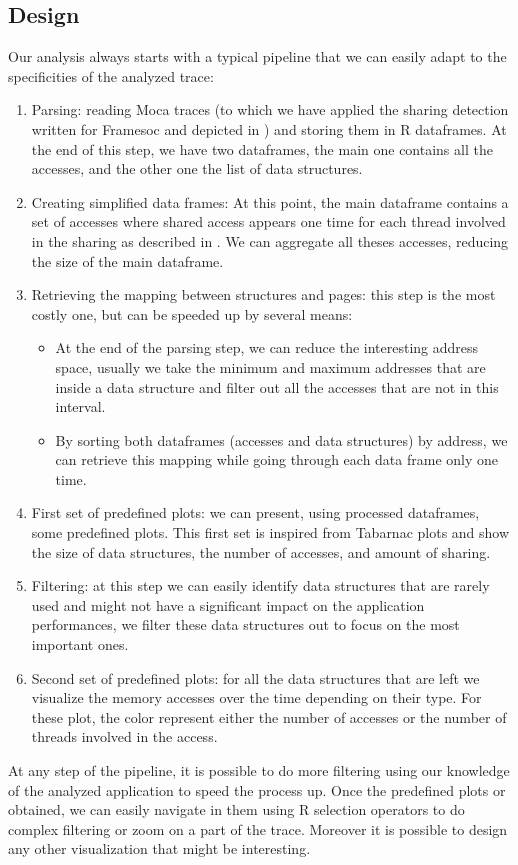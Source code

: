 \subsection{Design}

Our analysis always starts with a typical pipeline that we can easily adapt to the specificities of the analyzed trace:
\begin{enumerate}
    \item Parsing: reading \gls{Moca} traces (to which we have applied the sharing detection written for \gls{Framesoc} and depicted in )
        and storing them in \gls{R} dataframes.
        At the end of this step, we have two dataframes, the main one contains all the accesses, and the other one the list of data structures.
    \item Creating simplified data frames: At this point, the main dataframe contains a set of accesses where shared access appears one time for each thread involved in the sharing as described in .
        We can aggregate all theses accesses, reducing the size of the main dataframe.
    \item Retrieving the mapping between structures and pages: this step is the most costly one, but can be speeded up by several means:
        \begin{itemize}
            \item At the end of the parsing step, we can reduce the interesting address space, usually we take the minimum and maximum addresses that are inside a data structure and filter out all the accesses that are not in this interval.
            \item By sorting both dataframes (accesses and data structures) by address, we can retrieve this mapping while going through each data frame only one time.
        \end{itemize}
    \item First set of predefined plots: we can present, using processed dataframes, some predefined  plots. This first set is inspired from \gls{Tabarnac} plots and show the size of data structures, the number of accesses, and amount of sharing.
    \item  Filtering: at this step we can easily identify data structures that are rarely used and might not have a significant impact on the application performances, we filter these data structures out to focus on the most important ones.
    \item Second set of predefined plots: for all the data structures that are left we visualize the memory accesses over the time depending on their type.
        For these plot, the color represent either the number of accesses or the number of threads involved in the access.
\end{enumerate}
At any step of the pipeline, it is possible to do more filtering using our knowledge of the analyzed application to speed the process up.
Once the predefined plots or obtained, we can easily navigate in them using \gls{R} selection operators to do complex filtering or zoom on a part of the trace.
Moreover it is possible to design any other visualization that might be interesting.

